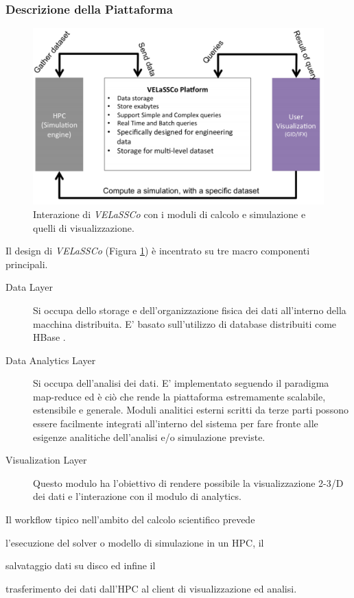 \subsubsection{Descrizione della Piattaforma}
\begin{figure}[!htbp]
	\centering
	\includegraphics[width=\textwidth]{images/vel}
	\caption{Interazione di \textit{VELaSSCo} con i moduli di calcolo e simulazione e quelli di visualizzazione.}
	\label{fig:vel}
\end{figure}
Il design di \textit{VELaSSCo} (Figura \ref{fig:vel}) è incentrato su tre macro componenti principali.
\begin{description}
	\item [Data Layer] Si occupa dello storage e dell'organizzazione fisica dei dati all'interno della macchina distribuita. E' basato sull'utilizzo di database distribuiti come HBase .
	\item [Data Analytics Layer] Si occupa dell'analisi dei dati. E' implementato seguendo il paradigma map-reduce  ed è ciò che rende la piattaforma estremamente scalabile, estensibile e generale. Moduli analitici esterni scritti da terze parti possono essere facilmente integrati all'interno del sistema per fare fronte alle esigenze analitiche dell'analisi e/o simulazione previste.
	\item [Visualization Layer] 
	Questo modulo ha l'obiettivo di rendere possibile la visualizzazione 2-3/D dei dati e l'interazione con il modulo di analytics.
\end{description}
Il workflow tipico nell'ambito del calcolo scientifico prevede
\begin{inparadesc}
	\item[l'esecuzione] del solver o modello di simulazione in un HPC, il
	\item[salvataggio]  dati su disco ed infine il
	\item[trasferimento] dei dati dall'HPC al client di visualizzazione ed analisi.
\end{inparadesc}
